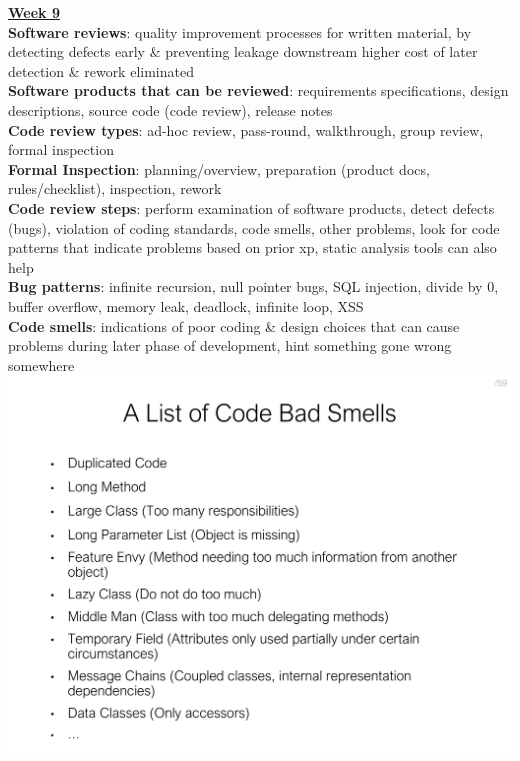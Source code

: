 \documentclass[a4paper]{article}
\begin{document}
\begin{multicols}{3}
        \underline{\textbf{Week 9}}\\
        \textbf{Software reviews}: quality improvement processes for written material, by detecting defects early \& preventing leakage downstream higher cost of later detection \& rework eliminated\\
        \textbf{Software products that can be reviewed}: requirements specifications, design descriptions, source code (code review), release notes\\
        \textbf{Code review types}: ad-hoc review, pass-round, walkthrough, group review, formal inspection\\
        \textbf{Formal Inspection}: planning/overview, preparation (product docs, rules/checklist), inspection, rework\\
        \textbf{Code review steps}: perform examination of software products, detect defects (bugs), violation of coding standards, code smells, other problems, look for code patterns that indicate problems based on prior xp, static analysis tools can also help\\
        \textbf{Bug patterns}: infinite recursion, null pointer bugs, SQL injection, divide by 0, buffer overflow, memory leak, deadlock, infinite loop, XSS\\
        \textbf{\textbf{Code smells}}: indications of poor coding \& design choices that can cause problems during later phase of development, hint something gone wrong somewhere
        \includegraphics[width=\linewidth]{418.pdf}\\

\end{multicols}
\end{document}
